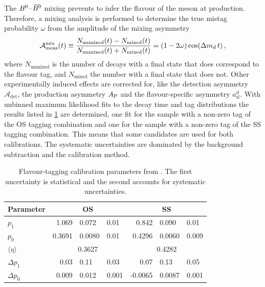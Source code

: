 The ${{B}^0}$--${{\kern 0.18em\overline{\kern -0.18em B}{}}{}^0}$ mixing prevents to infer the flavour of the \Bd meson at
production. Therefore, a mixing analysis is performed to determine the true
mistag probability $\omega$ from the amplitude of the mixing asymmetry
\begin{equation}
\mathcal{A}^{\text{mix}}_{\text{meas}} (t) \equiv \frac{N_{\text{unmixed}}(t) - N_{\text{mixed}}(t)}{N_{\text{unmixed}}(t) + N_{\text{mixed}}(t)}
 =(1-2\omega) \cos({\Delta m_{{d}}}\,t) \,,
\label{eq:dataanalysis:taggingcalibration:dsdcalibration:asymmetry}
\end{equation}
where $N_{\text{unmixed}}$ is the number of \BdToDsD decays with a final state
that does correspond to the flavour tag, and $N_{\text{mixed}}$ the number
with a final state that does not. Other experimentally induced effects are
corrected for, like the detection asymmetry $\mathcal{A}_{\mathrm{det}}$, the
production asymmetry $A_{\mathrm{P}}$ and the flavour-specific asymmetry
$a_{\mathrm{sl}}^d$. With unbinned maximum likelihood fits to the decay time
and tag distributions the results listed in
\cref{tab:dataanalysis:taggingcalibration:dsdcalibration} are determined, one
fit for the sample with a non-zero tag of the OS tagging combination and one
for the sample with a non-zero tag of the SS tagging combination. This means
that some candidates are used for both calibrations. The systematic
uncertainties are dominated by the background subtraction and the calibration
method.

\begin{table}[htb]
\caption{Flavour-tagging calibration parameters from \BdToDsD. The first
uncertainty is statistical and the second accounts for systematic
uncertainties.}
\label{tab:dataanalysis:taggingcalibration:dsdcalibration}
\centering
\begin{tabular}{lr@{$\,\pm\,$}l@{$\,\pm\,$}lr@{$\,\pm\,$}l@{$\,\pm\,$}l}
  \toprule
  Parameter           & \multicolumn{3}{c}{OS}   & \multicolumn{3}{c}{SS} \\
  \midrule
  $p_{1}$               & 1.069   & 0.072  & 0.01  & 0.842   & 0.090  & 0.01  \\
  $p_{0}$               & 0.3691  & 0.0080 & 0.01  & 0.4296  & 0.0060 & 0.009 \\
  $\langle \eta\rangle$ & \multicolumn{3}{c}{0.3627} & \multicolumn{3}{c}{0.4282} \\
  $\Delta p_{1}$        & 0.03    & 0.11   & 0.03  & 0.07    & 0.13   & 0.05  \\
  $\Delta p_{0}$        & 0.009   & 0.012  & 0.001 & -0.0065 & 0.0087 & 0.001 \\
  \bottomrule
\end{tabular}
\end{table}

